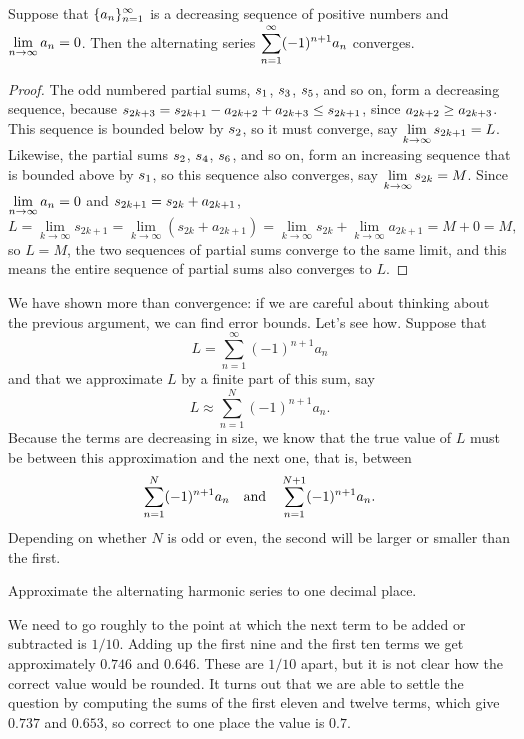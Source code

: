\begin{theorem}
\label{thm:alternating-series-test}
Suppose that $\displaystyle\{a_n\}_{n=1}^\infty$ is a decreasing
sequence of positive numbers and $\displaystyle\lim_{n\to\infty}a_n=0$. Then the
alternating series $\displaystyle\sum_{n=1}^\infty (-1)^{n+1} a_n$ converges.
\end{theorem}



\begin{proof} The odd numbered partial sums, $\displaystyle s_1$, $\displaystyle s_3$, $\displaystyle s_5$,
and so on, form a decreasing sequence, because
$\displaystyle s_{2k+3}=s_{2k+1}-a_{2k+2}+a_{2k+3}\le s_{2k+1}$, since
$\displaystyle a_{2k+2}\ge a_{2k+3}$. This sequence is bounded below by
$\displaystyle s_2$, so it must converge, say 
$\displaystyle\lim_{k\to\infty}s_{2k+1}=L$.
Likewise, the partial sums $\displaystyle s_2$, $\displaystyle s_4$, $\displaystyle s_6$,
and so on, form an increasing sequence that is bounded above by
$\displaystyle s_1$, so this sequence also converges, say 
$\displaystyle\lim_{k\to\infty}s_{2k}=M$. Since $\displaystyle\lim_{n\to\infty} a_n=0$ and
$\displaystyle s_{2k+1}= s_{2k}+a_{2k+1}$,
$$
  L=\lim_{k\to\infty}s_{2k+1}=\lim_{k\to\infty}(s_{2k}+a_{2k+1})=
  \lim_{k\to\infty}s_{2k}+\lim_{k\to\infty}a_{2k+1}=M+0=M,
$$
so $L=M$, the two sequences of partial sums converge to the same
limit, and this means the entire sequence of partial sums also
converges to $L$.
\end{proof}

We have shown more than convergence: if we are careful about thinking
about the previous argument, we can find error bounds. Let's see
how. Suppose that
$$L=\sum_{n=1}^\infty (-1)^{n+1} a_n$$
and that we approximate $L$ by a finite part of this sum, say
$$L\approx \sum_{n=1}^N (-1)^{n+1} a_n.$$
Because the terms are decreasing in size, we know that the true value
of $L$ must be between this approximation and the next one, that is,
between 
$$
  \sum_{n=1}^N (-1)^{n+1} a_n \hbox{\quad and\quad}
  \sum_{n=1}^{N+1} (-1)^{n+1} a_n.
$$
Depending on whether $N$ is odd or even, the second will be larger or
smaller than the first.

\begin{example}
Approximate the alternating harmonic series to one decimal place.
\end{example}
\begin{solution}
We need to go roughly to the point at which the next term to be added
or subtracted is $1/10$. Adding up the first nine and the first ten
terms we get approximately $0.746$ and $0.646$. These are $1/10$
apart, but it is not clear how the correct value would be rounded. It
turns out that we are able to settle the question by computing the
sums of the first eleven and twelve terms, which give
$0.737$ and $0.653$, so correct to one place the value is $0.7$.
\end{solution}


